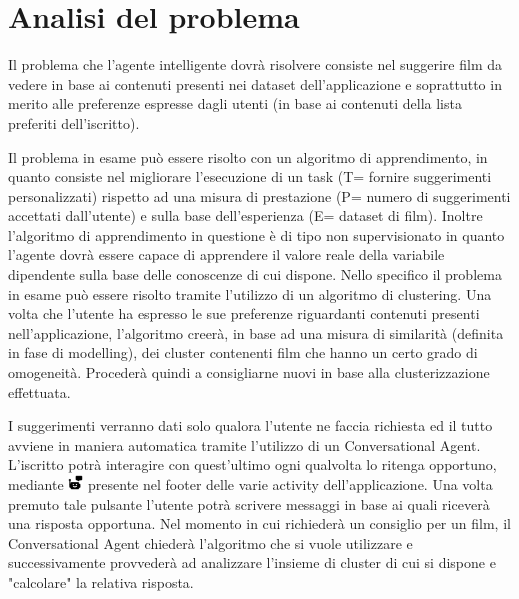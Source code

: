 \documentclass[a4paper, 10pt]{report}
\begin{document}
        \section{Analisi del problema}\label{sec:analisi-del-problema}

            Il problema che l'agente intelligente dovrà risolvere consiste nel suggerire film da vedere in base ai contenuti
            presenti nei dataset dell'applicazione e soprattutto in merito alle preferenze espresse dagli utenti (in base ai
            contenuti della lista preferiti dell'iscritto).

            Il problema in esame può essere risolto con un algoritmo di apprendimento, in quanto consiste nel migliorare l'esecuzione
            di un task (T= fornire suggerimenti personalizzati) rispetto ad una misura di prestazione (P= numero di suggerimenti accettati
            dall'utente) e sulla base dell'esperienza (E= dataset di film). Inoltre l'algoritmo di apprendimento
            in questione è di tipo non supervisionato in quanto l'agente dovrà essere capace di apprendere il valore reale della
            variabile dipendente sulla base delle conoscenze di cui dispone.
            Nello specifico il problema in esame può essere risolto tramite l'utilizzo di un algoritmo di clustering. Una volta che l'utente
            ha espresso le sue preferenze riguardanti contenuti presenti nell'applicazione, l'algoritmo creerà, in base ad una misura di similarità
            (definita in fase di modelling), dei cluster contenenti film che hanno un certo grado di omogeneità. Procederà quindi a consigliarne nuovi
            in base alla clusterizzazione effettuata.

            I suggerimenti verranno dati solo qualora l'utente ne faccia richiesta ed il tutto avviene in maniera automatica tramite l'utilizzo
            di un Conversational Agent. L'iscritto potrà interagire con quest'ultimo ogni qualvolta lo ritenga opportuno,
            mediante \includegraphics[width=0.4cm]{deployment/icona_chatbot.png} presente nel footer delle varie activity dell'applicazione.
            Una volta premuto tale pulsante l'utente potrà scrivere messaggi in base ai quali riceverà una risposta opportuna.
            Nel momento in cui richiederà un consiglio per un film, il Conversational Agent chiederà l'algoritmo che si vuole utilizzare e
            successivamente provvederà ad analizzare l'insieme di cluster di cui si dispone e "calcolare" la relativa risposta.
\end{document}
